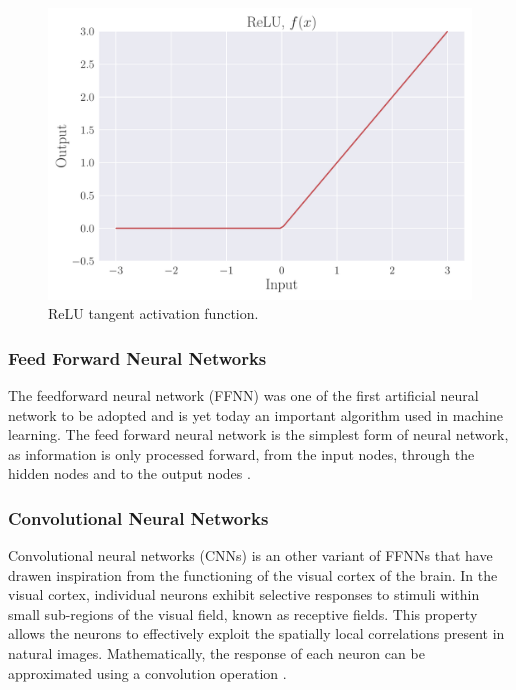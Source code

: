 \documentclass[a4paper, UKenglish, 11pt]{uiomaster}
\begin{document}

\begin{figure}
    \centering
    \includegraphics[width=\linewidth]{figures/ReLU.pdf}
    \caption{ReLU tangent activation function.}
    \label{fig:ReLU}
\end{figure}


\subsubsection{Feed Forward Neural Networks}
The feedforward neural network (FFNN) was one of the first artificial neural network to be adopted and is yet today an important algorithm used in machine learning. The feed forward neural network is the simplest form of neural network, as information is only processed forward, from the input nodes, through the hidden nodes and to the output nodes \cite{Hjorth-Jensen2022}.


\subsubsection{Convolutional Neural Networks}
Convolutional neural networks (CNNs) is an other variant of FFNNs that have drawen inspiration from the functioning of the visual cortex of the brain. In the visual cortex, individual neurons exhibit selective responses to stimuli within small sub-regions of the visual field, known as receptive fields. This property allows the neurons to effectively exploit the spatially local correlations present in natural images. Mathematically, the response of each neuron can be approximated using a convolution operation \cite{Hjorth-Jensen2022}.
\end{document}
